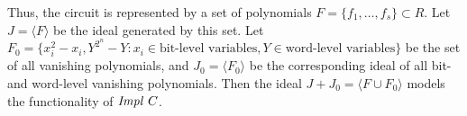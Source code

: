 Thus, the circuit is represented
by a set of polynomials $F=\{f_1,\dots,f_s\} \subset
R$. Let $J =\langle F\rangle$ be the ideal
generated by this set.
Let $F_0 = \{x_i^2-x_i, Y^{2^n}-Y: x_i \in \text{bit-level variables},
Y \in \text{word-level variables}\}$ be the set of all vanishing
polynomials, and $J_0 = \langle F_0\rangle$ be the corresponding ideal
of all bit- and word-level vanishing polynomials. Then the ideal
$J+J_0 = \langle F \cup F_0\rangle$ models the functionality of
${\it Impl} ~C$.


